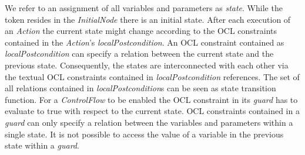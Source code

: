 \documentclass[runningheads,a4paper]{llncs}%
\newcommand{\UMLType}[1]{\textsf{\textit{#1}}} %
\newcommand{\UMLReference}[1]{\textsf{\textit{#1}}} %
\begin{document}
We refer to an assignment of all variables and parameters as \emph{state}. While the token resides in the \UMLType{InitialNode} there is an initial state. After each execution of an \UMLType{Action} the current state might change according to the OCL constraints contained in the \UMLType{Action}'s \UMLReference{localPostcondition}. An OCL constraint contained as \UMLType{localPostcondition} can specify a relation between the current state and the previous state. Consequently, the states are interconnected with each other via the textual OCL constraints contained in \UMLReference{localPostcondition} references. The set of all relations contained in \UMLType{localPostcondition}s can be seen as state transition function. For a \UMLType{ControlFlow} to be enabled the OCL constraint in its \UMLReference{guard} has to evaluate to true with respect to the current state. OCL constraints contained in a \UMLReference{guard} can only specify a relation between the variables and parameters within a single state. It is not possible to access the value of a variable in the previous state within a \UMLReference{guard}.%
\end{document}
